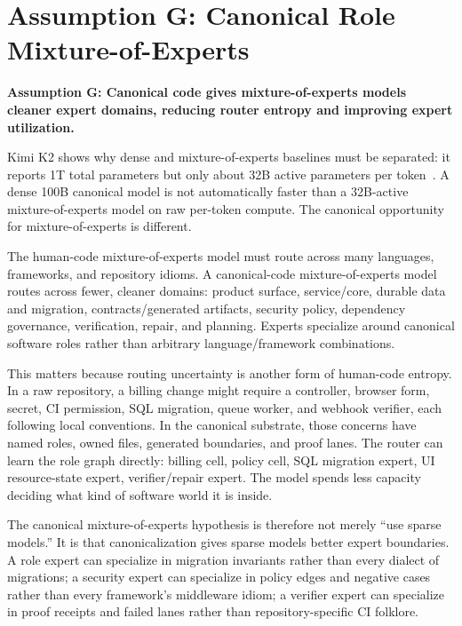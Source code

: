 \section{Assumption G: Canonical Role Mixture-of-Experts}

\textbf{Assumption G: Canonical code gives mixture-of-experts models cleaner expert domains, reducing router entropy and improving expert utilization.}

Kimi K2 shows why dense and mixture-of-experts baselines must be separated: it reports 1T total parameters but only about 32B active parameters per token~\cite{kimiK2,kimiDocs}. A dense 100B canonical model is not automatically faster than a 32B-active mixture-of-experts model on raw per-token compute. The canonical opportunity for mixture-of-experts is different.

The human-code mixture-of-experts model must route across many languages, frameworks, and repository idioms. A canonical-code mixture-of-experts model routes across fewer, cleaner domains: product surface, service/core, durable data and migration, contracts/generated artifacts, security policy, dependency governance, verification, repair, and planning. Experts specialize around canonical software roles rather than arbitrary language/framework combinations.

This matters because routing uncertainty is another form of human-code entropy. In a raw repository, a billing change might require a controller, browser form, secret, CI permission, SQL migration, queue worker, and webhook verifier, each following local conventions. In the canonical substrate, those concerns have named roles, owned files, generated boundaries, and proof lanes. The router can learn the role graph directly: billing cell, policy cell, SQL migration expert, UI resource-state expert, verifier/repair expert. The model spends less capacity deciding what kind of software world it is inside.

The canonical mixture-of-experts hypothesis is therefore not merely ``use sparse models.'' It is that canonicalization gives sparse models better expert boundaries. A role expert can specialize in migration invariants rather than every dialect of migrations; a security expert can specialize in policy edges and negative cases rather than every framework's middleware idiom; a verifier expert can specialize in proof receipts and failed lanes rather than repository-specific CI folklore.

